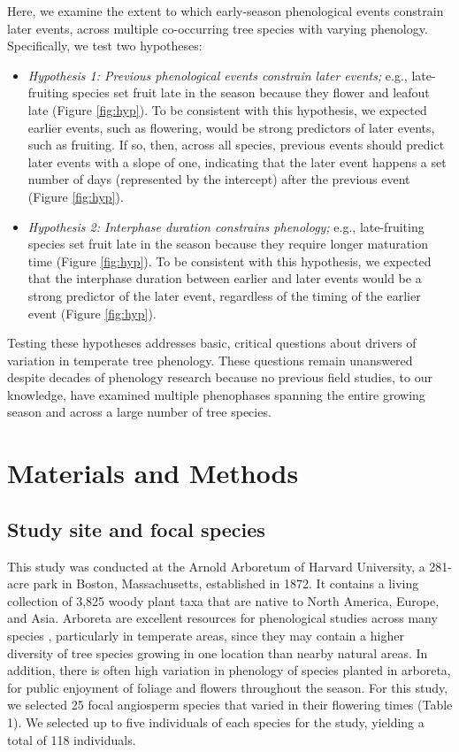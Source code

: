 \documentclass{article}
\begin{document}
\par Here, we examine the extent to which early-season phenological events constrain later events, across multiple co-occurring tree species with varying phenology. Specifically, we test two hypotheses:
\begin{itemize}
\item \textit{Hypothesis 1: Previous phenological events constrain later events;} e.g., late-fruiting species set fruit late in the season because they flower and leafout late  (Figure \ref{fig:hyp}). To be consistent with this hypothesis, we expected earlier events, such as flowering, would be strong predictors of later events, such as fruiting. If so, then, across all species, previous events should predict later events with a slope of one, indicating that the later event happens a set number of days (represented by the intercept) after the previous event (Figure \ref{fig:hyp}).
\item \textit{Hypothesis 2: Interphase duration constrains phenology;} e.g., late-fruiting species set fruit late in the season because they require longer maturation time (Figure \ref{fig:hyp}). To be consistent with this hypothesis, we expected that the interphase duration between earlier and later events would be a strong predictor of the later event, regardless of the timing  of the earlier event (Figure \ref{fig:hyp}).
\end{itemize}
Testing these hypotheses addresses basic, critical questions about drivers of variation in temperate tree phenology. These questions remain unanswered despite decades of phenology research because no previous field studies, to our knowledge, have examined multiple phenophases spanning the entire growing season and across a large number of tree species. 
\section* {Materials and Methods}
\subsection*{Study site and focal species}
This study was conducted at the Arnold Arboretum of Harvard University, a 281-acre park in Boston, Massachusetts, established in 1872. It contains a living collection of 3,825 woody plant taxa that are native to North America, Europe, and Asia. Arboreta are excellent resources for phenological studies across many species \citep [e.g., ][]{primack2009a}, particularly in temperate areas, since they may contain a higher diversity of tree species growing in one location than nearby natural areas. In addition, there is often high variation in phenology of species planted in arboreta, for public enjoyment of foliage and flowers throughout the season. For this study, we selected 25 focal angiosperm species that varied in their flowering times (Table 1). We selected up to five individuals of each species for the study, yielding a total of 118 individuals.
\end{document}
